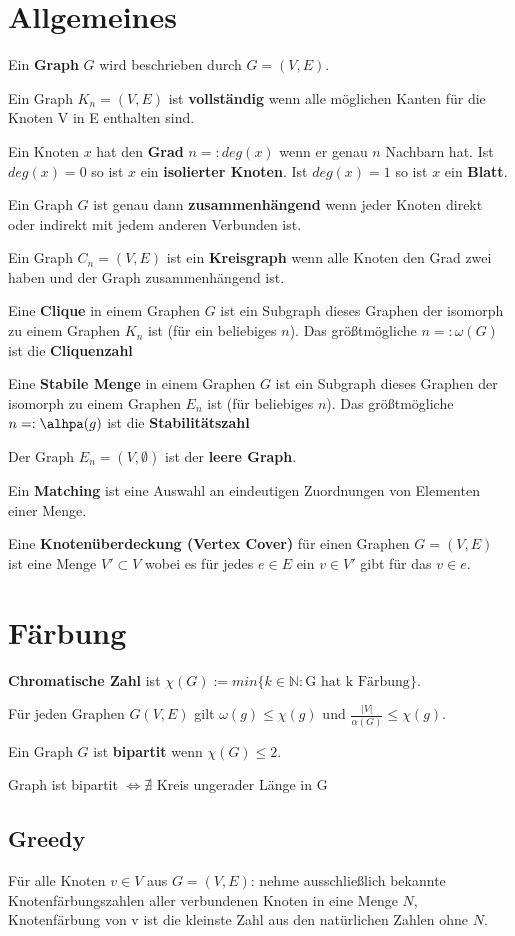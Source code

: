 \documentclass[10pt,a4paper]{article}
\begin{document}
\section{Allgemeines}
Ein \textbf{Graph} $G$ wird beschrieben durch $G = (V, E)$.

Ein Graph $K_n = (V, E)$ ist \textbf{vollständig} wenn alle möglichen Kanten für die Knoten V in E enthalten sind.

Ein Knoten $x$ hat den \textbf{Grad} $n =: deg(x)$ wenn er genau $n$ Nachbarn hat. Ist $deg(x) = 0$ so ist $x$ ein \textbf{isolierter Knoten}. Ist $deg(x) = 1$ so ist $x$ ein \textbf{Blatt}. 

Ein Graph $G$ ist genau dann \textbf{zusammenhängend} wenn jeder Knoten direkt oder indirekt mit jedem anderen Verbunden ist.

Ein Graph $C_n = (V, E)$ ist ein \textbf{Kreisgraph} wenn alle Knoten den Grad zwei haben und der Graph zusammenhängend ist.

Eine \textbf{Clique} in einem Graphen $G$ ist ein Subgraph dieses Graphen der isomorph zu einem Graphen $K_n$ ist (für ein beliebiges $n$). Das größtmögliche $n =: \omega(G)$ ist die \textbf{Cliquenzahl}

Eine \textbf{Stabile Menge} in einem Graphen $G$ ist ein Subgraph dieses Graphen der isomorph zu einem Graphen $E_n$ ist (für beliebiges $n$). Das größtmögliche $n =: \alhpa(g)$ ist die \textbf{Stabilitätszahl}

Der Graph $E_n = (V, \emptyset)$ ist der \textbf{leere Graph}.

Ein \textbf{Matching} ist eine Auswahl an eindeutigen Zuordnungen von Elementen einer Menge.

Eine \textbf{Knotenüberdeckung (Vertex Cover)} für einen Graphen $G = (V, E)$ ist eine Menge $V' \subset V$ wobei es für jedes $e \in E$ ein $v \in V'$ gibt für das $v \in e$.
\section{Färbung}
\textbf{Chromatische Zahl} ist $\chi(G) := min\lbrace k \in \mathbb{N} : \mbox{G hat k Färbung} \rbrace$.

Für jeden Graphen $G(V,E)$ gilt $\omega(g) \leq \chi(g)$ und
$\frac{|V|}{\alpha(G)} \leq \chi(g)$.

Ein Graph $G$ ist \textbf{bipartit} wenn $\chi(G) \leq 2$.

Graph ist bipartit $\Leftrightarrow \nexists$ Kreis ungerader Länge in G
\subsection{Greedy}
Für alle Knoten $v \in V$ aus $G = (V, E)$: nehme ausschließlich bekannte Knotenfärbungszahlen aller verbundenen Knoten in eine Menge $N$, Knotenfärbung von v ist die kleinste Zahl aus den natürlichen Zahlen ohne $N$.
\end{document}
